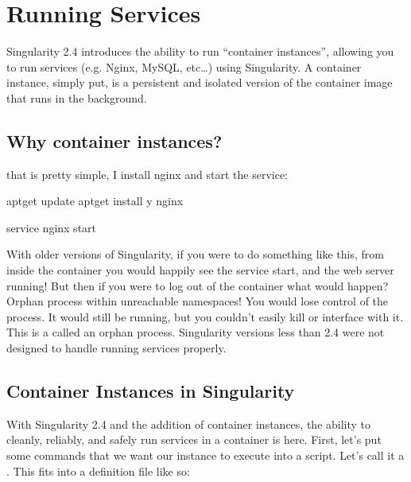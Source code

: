 \documentclass[letterpaper,10pt,english]{sphinxmanual}
\begin{document}
\chapter{Running Services}
\label{\detokenize{running_services:running-services}}\label{\detokenize{running_services:id1}}\label{\detokenize{running_services::doc}}
Singularity 2.4 introduces the ability to run “container instances”,
allowing you to run services (e.g. Nginx, MySQL, etc…) using
Singularity. A container instance, simply put, is a persistent and
isolated version of the container image that runs in the background.


\section{Why container instances?}
\label{\detokenize{running_services:why-container-instances}}
that is pretty simple, I install nginx and start the service:

%
\begin{sphinxVerbatim}[commandchars=\\\{\}]
apt\PYGZhy{}get update \PYGZam{}\PYGZam{} apt\PYGZhy{}get install \PYGZhy{}y nginx

service nginx start
\end{sphinxVerbatim}

With older versions of Singularity, if you were to do something like
this, from inside the container you would happily see the service
start, and the web server running! But then if you were to log out of
the container what would happen?
Orphan process within unreachable namespaces!
You would lose control of the process. It would still be running, but
you couldn’t easily kill or interface with it. This is a called an
orphan process. Singularity versions less than 2.4 were not designed
to handle running services properly.


\section{Container Instances in Singularity}
\label{\detokenize{running_services:container-instances-in-singularity}}
With Singularity 2.4 and the addition of container instances, the
ability to cleanly, reliably, and safely run services in a container is
here. First, let’s put some commands that we want our instance to
execute into a script. Let’s call it a . This fits into a definition
file like so:
\end{document}
